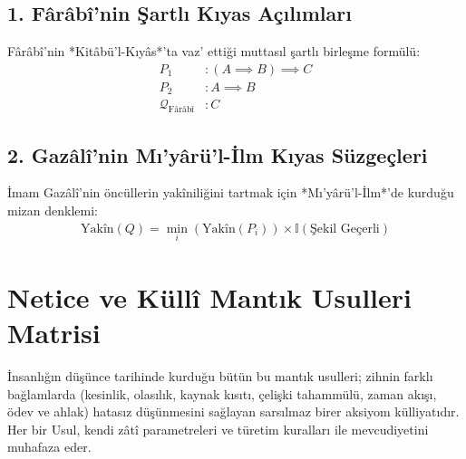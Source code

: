\documentclass[11pt, a4paper]{article}
\begin{document}
\subsection{1. Fârâbî'nin Şartlı Kıyas Açılımları}
Fârâbî'nin *Kitâbü'l-Kıyâs*'ta vaz' ettiği muttasıl şartlı birleşme formülü:
\begin{align}
P_1 &: (A \implies B) \implies C \\
P_2 &: A \implies B \\
\mathcal{Q}_{\text{Fârâbî}} &: C
\end{align}

\subsection{2. Gazâlî'nin Mı'yârü'l-İlm Kıyas Süzgeçleri}
İmam Gazâlî'nin öncüllerin yakîniliğini tartmak için *Mı'yârü'l-İlm*'de kurduğu mizan denklemi:
\begin{align}
\text{Yakîn}(Q) = \min_{i} \left( \text{Yakîn}(P_i) \right) \times \mathbb{I}(\text{Şekil Geçerli})
\end{align}

\section{Netice ve Küllî Mantık Usulleri Matrisi}

İnsanlığın düşünce tarihinde kurduğu bütün bu mantık usulleri; zihnin farklı bağlamlarda (kesinlik, olasılık, kaynak kısıtı, çelişki tahammülü, zaman akışı, ödev ve ahlak) hatasız düşünmesini sağlayan sarsılmaz birer aksiyom külliyatıdır. Her bir Usul, kendi zâtî parametreleri ve türetim kuralları ile mevcudiyetini muhafaza eder.
\end{document}
